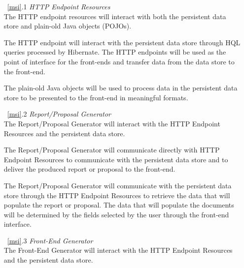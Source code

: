 \documentclass{article}
\newcommand{\br}{\vspace{2mm}}
\begin{document}
\begin{enumerate}
    \item[~\ref{msi}.1 ] \emph{HTTP Endpoint Resources}\br\\
        The HTTP endpoint resources will interact with both the persistent
        data store and plain-old Java objects (POJOs).

        The HTTP endpoint will interact with the persistent data store through
        HQL queries processed by Hibernate.  The HTTP endpoints will be used as
        the point of interface for the front-ends and transfer data from the
        data store to the front-end.

        The plain-old Java objects will be used to process data in the persistent
        data store to be presented to the front-end in meaningful formats.
    \item[~\ref{msi}.2 ] \emph{Report/Proposal Generator}\br\\
        The Report/Proposal Generator will interact with the HTTP Endpoint
        Resources and the persistent data store.

        The Report/Proposal Generator will communicate directly with HTTP Endpoint
        Resources to communicate with the persistent data store and to deliver
        the produced report or proposal to the front-end.

        The Report/Proposal Generator will communicate with the persistent
        data store through the HTTP Endpoint Resources to retrieve the data
        that will populate the report or proposal.  The data that will populate
        the documents will be determined by the fields selected by the user
        through the front-end interface.
    \item[~\ref{msi}.3 ] \emph{Front-End Generator}\br\\
        The Front-End Generator will interact with the HTTP Endpoint Resources
        and the persistent data store.


\end{enumerate}
\end{document}
